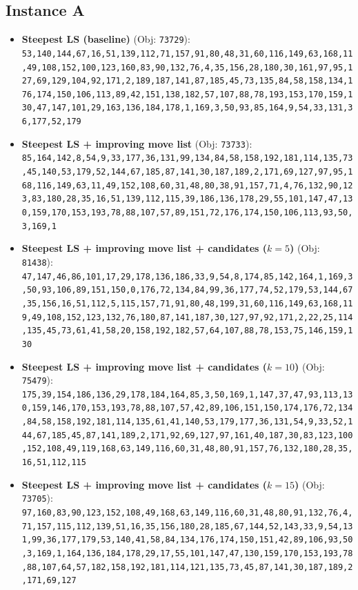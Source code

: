\subsection{Instance A}
\begin{itemize}[leftmargin=1.5em]
    \item \textbf{Steepest LS (baseline)} (Obj: \texttt{73729}):\\
    \texttt{53,140,144,67,16,51,139,112,71,157,91,80,48,31,60,116,149,63,168,11,49,108,152,100,123,160,83,90,132,76,4,35,156,28,180,30,161,97,95,127,69,129,104,92,171,2,189,187,141,87,185,45,73,135,84,58,158,134,176,174,150,106,113,89,42,151,138,182,57,107,88,78,193,153,170,159,130,47,147,101,29,163,136,184,178,1,169,3,50,93,85,164,9,54,33,131,36,177,52,179}
    \item \textbf{Steepest LS + improving move list} (Obj: \texttt{73733}):\\
    \texttt{85,164,142,8,54,9,33,177,36,131,99,134,84,58,158,192,181,114,135,73,45,140,53,179,52,144,67,185,87,141,30,187,189,2,171,69,127,97,95,168,116,149,63,11,49,152,108,60,31,48,80,38,91,157,71,4,76,132,90,123,83,180,28,35,16,51,139,112,115,39,186,136,178,29,55,101,147,47,130,159,170,153,193,78,88,107,57,89,151,72,176,174,150,106,113,93,50,3,169,1}
    \item \textbf{Steepest LS + improving move list + candidates ($k = 5$)} (Obj: \texttt{81438}):\\
    \texttt{47,147,46,86,101,17,29,178,136,186,33,9,54,8,174,85,142,164,1,169,3,50,93,106,89,151,150,0,176,72,134,84,99,36,177,74,52,179,53,144,67,35,156,16,51,112,5,115,157,71,91,80,48,199,31,60,116,149,63,168,119,49,108,152,123,132,76,180,87,141,187,30,127,97,92,171,2,22,25,114,135,45,73,61,41,58,20,158,192,182,57,64,107,88,78,153,75,146,159,130}
    \item \textbf{Steepest LS + improving move list + candidates ($k = 10$)} (Obj: \texttt{75479}):\\
    \texttt{175,39,154,186,136,29,178,184,164,85,3,50,169,1,147,37,47,93,113,130,159,146,170,153,193,78,88,107,57,42,89,106,151,150,174,176,72,134,84,58,158,192,181,114,135,61,41,140,53,179,177,36,131,54,9,33,52,144,67,185,45,87,141,189,2,171,92,69,127,97,161,40,187,30,83,123,100,152,108,49,119,168,63,149,116,60,31,48,80,91,157,76,132,180,28,35,16,51,112,115}
    \item \textbf{Steepest LS + improving move list + candidates ($k = 15$)} (Obj: \texttt{73705}):\\
    \texttt{97,160,83,90,123,152,108,49,168,63,149,116,60,31,48,80,91,132,76,4,71,157,115,112,139,51,16,35,156,180,28,185,67,144,52,143,33,9,54,131,99,36,177,179,53,140,41,58,84,134,176,174,150,151,42,89,106,93,50,3,169,1,164,136,184,178,29,17,55,101,147,47,130,159,170,153,193,78,88,107,64,57,182,158,192,181,114,121,135,73,45,87,141,30,187,189,2,171,69,127}

\end{itemize}
